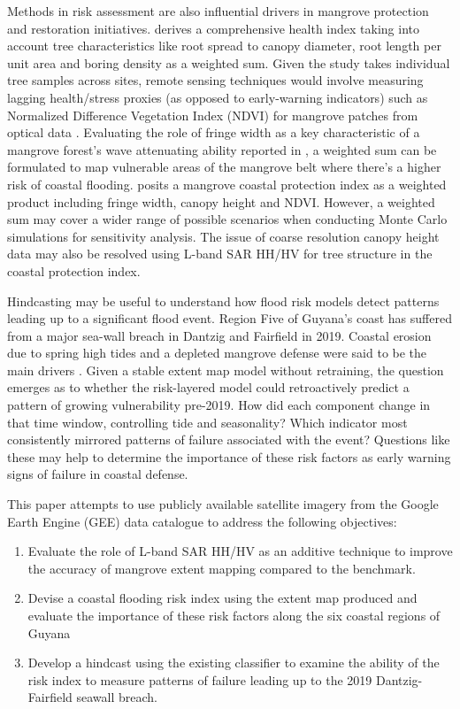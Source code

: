 \documentclass[project-plan]{report-template}
\begin{document}
Methods in risk assessment are also influential drivers in mangrove protection and restoration initiatives. \textcite{Liu2026} derives a comprehensive health index taking into account tree characteristics like root spread to canopy diameter, root length per unit area and boring density as a weighted sum. Given the study takes individual tree samples across sites, remote sensing techniques would involve measuring lagging health/stress proxies (as opposed to early-warning indicators) such as Normalized Difference Vegetation Index (NDVI) for mangrove patches from optical data \parencite{Liu2026}. Evaluating the role of fringe width as a key characteristic of a mangrove forest’s wave attenuating ability reported in \textcite{Best2022}, a weighted sum can be formulated to map vulnerable areas of the mangrove belt where there’s a higher risk of coastal flooding. \textcite{Xu2024} posits a mangrove coastal protection index as a weighted product including fringe width, canopy height and NDVI. However, a weighted sum may cover a wider range of possible scenarios when conducting Monte Carlo simulations for sensitivity analysis. The issue of coarse resolution canopy height data may also be resolved using L-band SAR HH/HV for tree structure in the coastal protection index.
\vspace{5 mm}

Hindcasting may be useful to understand how flood risk models detect patterns leading up to a significant flood event. Region Five of Guyana’s coast has suffered from a major sea-wall breach in Dantzig and Fairfield in 2019. Coastal erosion due to spring high tides and a depleted mangrove defense were said to be the main drivers \parencite{DailyHerald2019}. Given a stable extent map model without retraining, the question emerges as to whether the risk-layered model could retroactively predict a pattern of growing vulnerability pre-2019. How did each component change in that time window, controlling tide and seasonality? Which indicator most consistently mirrored patterns of failure associated with the event? Questions like these may help to determine the importance of these risk factors as early warning signs of failure in coastal defense.
\vspace{5 mm}

This paper attempts to use publicly available satellite imagery from the Google Earth Engine (GEE) data catalogue to address the following objectives:

\begin{enumerate}
    \item Evaluate the role of L-band SAR HH/HV as an additive technique to improve the accuracy of mangrove extent mapping compared to the \textcite{Chan2024} benchmark.
    \item Devise a coastal flooding risk index using the extent map produced and evaluate the importance of these risk factors along the six coastal regions of Guyana
    \item Develop a hindcast using the existing classifier to examine the ability of the risk index to measure patterns of failure leading up to the 2019 Dantzig-Fairfield seawall breach.
\end{enumerate}
\end{document}
